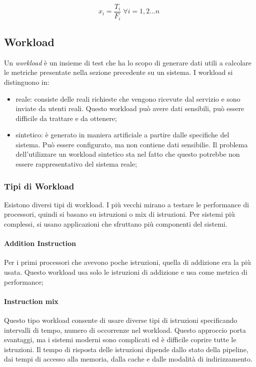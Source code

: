 \documentclass{article}
\begin{document}
\begin{equation}
  x_i = \frac{T_i}{F_i} \; \forall i = 1,2\dots n
  \label{eq:norm_throughput}
\end{equation}

\subsection{Workload}
Un \textit{workload} è un insieme di test che ha lo scopo di generare dati utili a calcolare
le metriche presentate nella sezione precedente su un sistema. I workload si distinguono in:
\begin{itemize}
  \item reale: consiste delle reali richieste che vengono ricevute dal servizio e sono 
    inviate da utenti reali. Questo workload può avere dati sensibili, può essere difficile
    da trattare e da ottenere;
  \item sintetico: è generato in maniera artificiale a partire dalle specifiche del sistema.
    Può essere configurato, ma non contiene dati sensibilie. Il problema dell'utilizzare un 
    workload sintetico sta nel fatto che questo potrebbe non essere rappresentativo del 
    sistema reale;
\end{itemize}


\subsubsection{Tipi di Workload}
Esistono diversi tipi di workload. I più vecchi mirano a testare le performance di
processori, quindi si basano su istruzioni o mix di istruzioni. Per sistemi più complessi,
si usano applicazioni che sfruttano più componenti del sistemi.

\paragraph{Addition Instruction} Per i primi processori che avevono poche istruzioni,
quella di addizione era la più usata. Questo workload usa solo le istruzioni di addizione 
e usa come metrica di performance;

\paragraph{Instruction mix} Questo tipo workload consente di usare diverse tipi di 
istruzioni specificando intervalli di tempo, numero di occorrenze nel workload. Questo 
approccio porta svantaggi, ma i sistemi moderni sono complicati ed è difficile coprire 
tutte le istruzioni. Il tempo di risposta delle istruzioni dipende dallo stato della 
pipeline, dai tempi di accesso alla memoria, dalla cache e dalle modalità di indirizzamento.
\end{document}
